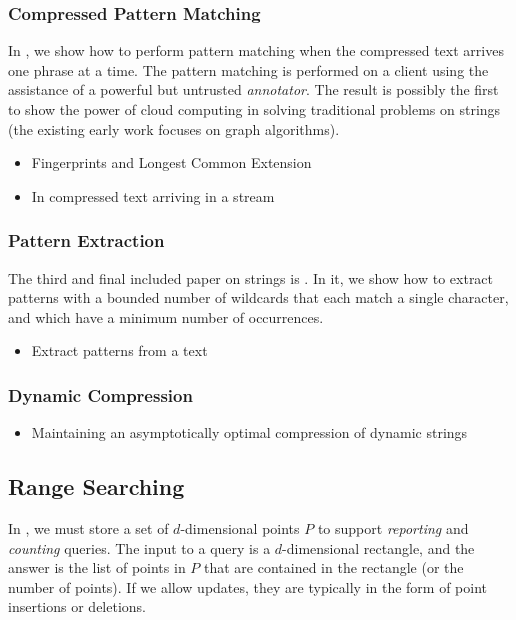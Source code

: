 \subsubsection{Compressed Pattern Matching} In , we show how to perform pattern matching when the compressed text arrives one phrase at a time. The pattern matching is performed on a client using the assistance of a powerful but untrusted \emph{annotator}. The result is possibly the first to show the power of cloud computing in solving traditional problems on strings (the existing early work focuses on graph algorithms). 


\begin{itemize}
    \item Fingerprints and Longest Common Extension
    \item In compressed text arriving in a stream
\end{itemize}


\subsubsection{Pattern Extraction}
The third and final included paper on strings is . In it, we show how to extract patterns with a bounded number of wildcards that each match a single character, and which have a minimum number of occurrences. 
\begin{itemize}
    \item Extract patterns from a text
\end{itemize}


\subsubsection{Dynamic Compression}

\begin{itemize}
    \item Maintaining an asymptotically optimal compression of dynamic strings
\end{itemize}


\subsection{Range Searching}

In , we must store a set of $d$-dimensional points $P$ to support \emph{reporting} and \emph{counting} queries. The input to a query is a $d$-dimensional rectangle, and the answer is the list of points in $P$ that are contained in the rectangle (or the number of points). If we allow updates, they are typically in the form of point insertions or deletions. 

